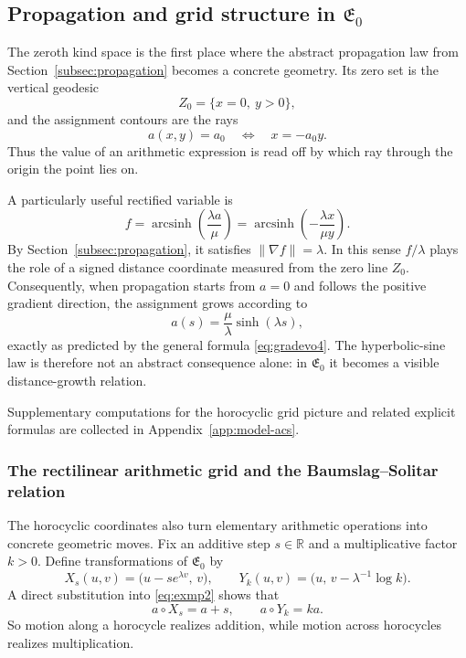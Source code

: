 \subsection{Propagation and grid structure in \texorpdfstring{$\mathfrak{E}_0$}{E0}}\label{subsec:geompropagation}

The zeroth kind space is the first place where the abstract propagation law from Section~\ref{subsec:propagation} becomes a concrete geometry. Its zero set is the vertical geodesic
\[
    Z_0 = \{x=0,\ y>0\},
\]
and the assignment contours are the rays
\[
    a(x,y)=a_0
    \quad\Longleftrightarrow\quad
    x=-a_0 y.
\]
Thus the value of an arithmetic expression is read off by which ray through the origin the point lies on.

A particularly useful rectified variable is
\[
    f=\operatorname{arcsinh}\!\left(\frac{\lambda a}{\mu}\right)
      = \operatorname{arcsinh}\!\left(-\frac{\lambda x}{\mu y}\right).
\]
By Section~\ref{subsec:propagation}, it satisfies $\|\nabla f\|=\lambda$. In this sense $f/\lambda$ plays the role of a signed distance coordinate measured from the zero line $Z_0$. Consequently, when propagation starts from $a=0$ and follows the positive gradient direction, the assignment grows according to
\begin{equation}\label{eq:e0-propagation}
    a(s)=\frac{\mu}{\lambda}\sinh(\lambda s),
\end{equation}
exactly as predicted by the general formula \eqref{eq:gradevo4}. The hyperbolic-sine law is therefore not an abstract consequence alone: in $\mathfrak{E}_0$ it becomes a visible distance-growth relation.

Supplementary computations for the horocyclic grid picture and related explicit formulas are collected in Appendix~\ref{app:model-acs}.

\subsubsection{The rectilinear arithmetic grid and the Baumslag--Solitar relation}\label{subsec:grids_revised}

The horocyclic coordinates also turn elementary arithmetic operations into concrete geometric moves. Fix an additive step $s\in\mathbb R$ and a multiplicative factor $k>0$. Define transformations of $\mathfrak{E}_0$ by
\[
    X_s(u,v) = \bigl(u-s e^{\lambda v},\, v\bigr),
    \qquad
    Y_k(u,v) = \bigl(u,\, v-\lambda^{-1}\log k\bigr).
\]
A direct substitution into \eqref{eq:exmp2} shows that
\[
    a\circ X_s = a+s,
    \qquad
    a\circ Y_k = ka.
\]
So motion along a horocycle realizes addition, while motion across horocycles realizes multiplication.

